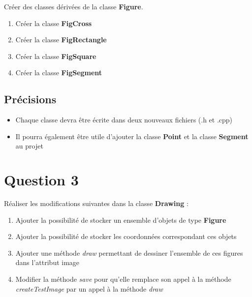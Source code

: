 \documentclass[
	12pt, %
]{fphw}
\begin{document}
\begin{problem}
	Créer des classes dérivées de la classe \textbf{Figure}.

\begin{enumerate}
	\item Créer la classe \textbf{FigCross}
	\item Créer la classe \textbf{FigRectangle}
	\item Créer la classe \textbf{FigSquare}
	\item Créer la classe \textbf{FigSegment}
\end{enumerate}

\end{problem}


\subsection*{Précisions}

\begin{itemize}
	\item Chaque classe devra être écrite dans deux nouveaux fichiers (.h et .cpp)
	\item Il pourra également être utile d'ajouter la classe \textbf{Point} et la classe \textbf{Segment} au projet
\end{itemize}


\section*{Question 3}

\begin{problem}

	Réaliser les modifications suivantes dans la classe \textbf{Drawing} :

	\begin{enumerate}
		\item Ajouter la possibilité de stocker un ensemble d'objets de type \textbf{Figure}
		\item Ajouter la possibilité de stocker les coordonnées correspondant ces objets
		\item Ajouter une méthode \emph{draw} permettant de dessiner l'ensemble de ces figures dans l'attribut image
		\item Modifier la méthode \emph{save} pour qu'elle remplace son appel à la méthode \emph{createTestImage} par un appel à la méthode \emph{draw}
	\end{enumerate}

\end{problem}
\end{document}
